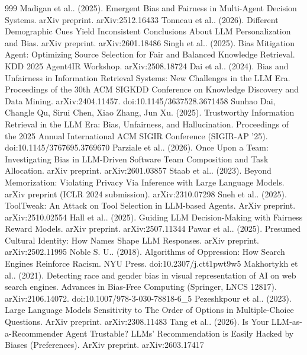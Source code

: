 \documentclass[10pt]{article}
\begin{document}
\begin{thebibliography}{999}
 Madigan et al.. (2025). Emergent Bias and Fairness in Multi-Agent Decision Systems. arXiv preprint. arXiv:2512.16433
 Tonneau et al.. (2026). Different Demographic Cues Yield Inconsistent Conclusions About LLM Personalization and Bias. arXiv preprint. arXiv:2601.18486
 Singh et al.. (2025). Bias Mitigation Agent: Optimizing Source Selection for Fair and Balanced Knowledge Retrieval. KDD 2025 Agent4IR Workshop. arXiv:2508.18724
 Dai et al.. (2024). Bias and Unfairness in Information Retrieval Systems: New Challenges in the LLM Era. Proceedings of the 30th ACM SIGKDD Conference on Knowledge Discovery and Data Mining. arXiv:2404.11457. doi:10.1145/3637528.3671458
 Sunhao Dai, Changle Qu, Sirui Chen, Xiao Zhang, Jun Xu. (2025). Trustworthy Information Retrieval in the LLM Era: Bias, Unfairness, and Hallucination. Proceedings of the 2025 Annual International ACM SIGIR Conference (SIGIR-AP '25). doi:10.1145/3767695.3769670
 Parziale et al.. (2026). Once Upon a Team: Investigating Bias in LLM-Driven Software Team Composition and Task Allocation. arXiv preprint. arXiv:2601.03857
 Staab et al.. (2023). Beyond Memorization: Violating Privacy Via Inference with Large Language Models. arXiv preprint (ICLR 2024 submission). arXiv:2310.07298
 Sneh et al.. (2025). ToolTweak: An Attack on Tool Selection in LLM-based Agents. ArXiv preprint. arXiv:2510.02554
 Hall et al.. (2025). Guiding LLM Decision-Making with Fairness Reward Models. arXiv preprint. arXiv:2507.11344
 Pawar et al.. (2025). Presumed Cultural Identity: How Names Shape LLM Responses. arXiv preprint. arXiv:2502.11995
 Noble S. U.. (2018). Algorithms of Oppression: How Search Engines Reinforce Racism. NYU Press. doi:10.2307/j.ctt1pwt9w5
 Makhortykh et al.. (2021). Detecting race and gender bias in visual representation of AI on web search engines. Advances in Bias-Free Computing (Springer, LNCS 12817). arXiv:2106.14072. doi:10.1007/978-3-030-78818-6\_5
 Pezeshkpour et al.. (2023). Large Language Models Sensitivity to The Order of Options in Multiple-Choice Questions. ArXiv preprint. arXiv:2308.11483
 Tang et al.. (2026). Is Your LLM-as-a-Recommender Agent Trustable? LLMs' Recommendation is Easily Hacked by Biases (Preferences). ArXiv preprint. arXiv:2603.17417

\end{thebibliography}
\end{document}
